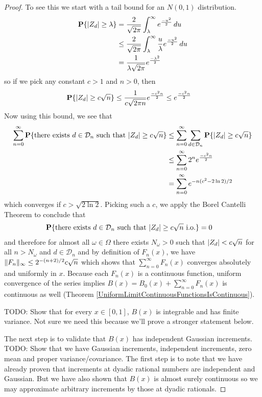 \begin{proof}
To see this we start with a tail bound for an $N(0,1)$ distribution.  
\begin{align*}
\textbf{P}\{\left \vert Z_d \right \vert \geq \lambda\} &= \frac{2}{\sqrt{2\pi}} \int_\lambda^\infty
e^{\frac{-u^2}{2}} \, du \\
&\leq  \frac{2}{\sqrt{2\pi}} \int_\lambda^\infty
\frac{u}{\lambda} e^{\frac{-u^2}{2}} \, du \\
&= \frac{1}{\lambda\sqrt{2\pi}} e^{\frac{-\lambda^2}{2}}
\end{align*}
so if we pick any constant $c > 1$ and $n > 0$, then 
\begin{align*}
\textbf{P}\{\left \vert Z_d \right \vert \geq c \sqrt{n}\} &\leq \frac{1}{c\sqrt{2\pi n}}
e^{\frac{-c^2 n}{2}} \leq e^{\frac{-c^2 n}{2}}
\end{align*}
Now using this bound, we see that
\begin{align*}
\sum_{n=0}^\infty \textbf{P}\{ \text {there exists $d \in
    \mathcal{D}_n$ such that $\left \vert Z_d \right \vert \geq c \sqrt{n}$}\} &\leq
\sum_{n=0}^\infty  \sum_{d \in \mathcal{D}_n} \textbf{P}\{\left \vert Z_d \right \vert
  \geq c \sqrt{n}\} \\
&\leq \sum_{n=0}^\infty 2^n e^{\frac{-c^2 n}{2}} \\
&= \sum_{n=0}^\infty
e^{-n(c^2 - 2\ln2)/2} 
\end{align*}
which converges if $c > \sqrt{2\ln2}$.  Picking such a $c$, we apply
the Borel Cantelli Theorem to conclude that 
\begin{align*}
\textbf{P}\{ \text {there exists $d \in
    \mathcal{D}_n$ such that $\left \vert Z_d \right \vert \geq c \sqrt{n}$ i.o.}\} &= 0
\end{align*}
and therefore for almost all $\omega \in \Omega$ there exists
$N_\omega > 0$ such that $\left \vert Z_d \right \vert < c \sqrt{n}$ for all $n >
N_\omega$ and $d \in \mathcal{D}_n$ and by definition of $F_n(x)$, we
have $\lVert F_n \rVert_\infty \leq 2^{-(n+2)/2} c \sqrt{n}$ which shows that
$\sum_{n=0}^\infty F_n(x)$ converges absolutely and uniformly in $x$.
Because each $F_n(x)$ is a continuous function, uniform convergence of
the series implies $B(x) = B_0(x) + \sum_{n=0}^\infty F_n(x)$ is continuous as
well (Theorem \ref{UniformLimitContinuousFunctionsIsContinuous}).

TODO: Show that for every $x \in [0,1]$, $B(x)$ is integrable and
has finite variance.  Not sure we need this because we'll prove a
stronger statement below.

The next step is to validate that $B(x)$ has independent Gaussian increments.
TODO: Show that we have Gaussian increments, independent increments,
zero mean and proper variance/covariance.  The first step is to note
that we have already proven that increments at dyadic rational numbers
are independent and Gaussian.  But we have also shown that $B(x)$ is
almost surely continuous so we may approximate arbitrary increments by
those at dyadic rationals.


\end{proof}
